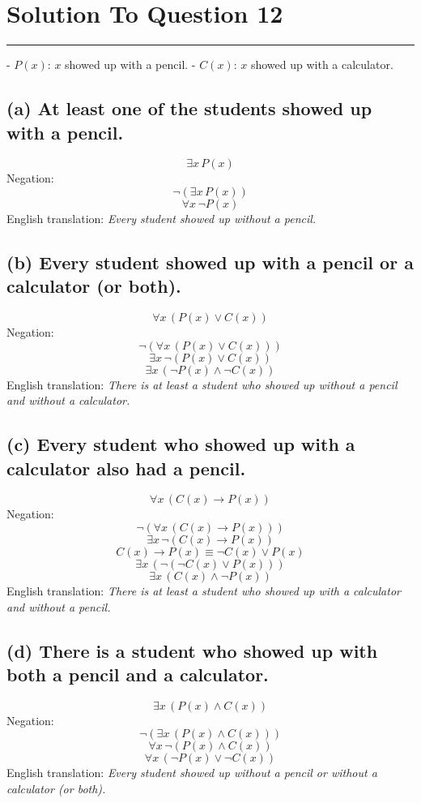 \documentclass{article}
\begin{document}
\section*{Solution To Question 12}
\hrule

- \( P(x) \): \( x \) showed up with a pencil.
- \( C(x) \): \( x \) showed up with a calculator.

\subsection*{(a) At least one of the students showed up with a pencil.}

\[
\exists x \, P(x)
\]
Negation:
\[
\lnot (\exists x \, P(x))
\]
\[
\forall x \, \lnot P(x)
\]
English translation:
\textit{Every student showed up without a pencil.}

\subsection*{(b) Every student showed up with a pencil or a calculator (or both).}
\[
\forall x \, (P(x) \lor C(x))
\]
Negation:
\[
\lnot (\forall x \, (P(x) \lor C(x)))
\]
\[
\exists x \, \lnot (P(x) \lor C(x))
\]
\[
\exists x \, (\lnot P(x) \land \lnot C(x))
\]
English translation:
\textit{There is at least a student who showed up without a pencil and without a calculator.}

\subsection*{(c) Every student who showed up with a calculator also had a pencil.}
\[
\forall x \, (C(x) \rightarrow P(x))
\]
Negation:
\[
\lnot (\forall x \, (C(x) \rightarrow P(x)))
\]
\[
\exists x \, \lnot (C(x) \rightarrow P(x))
\]
\[
C(x) \rightarrow P(x) \equiv \lnot C(x) \lor P(x)
\]
\[
\exists x \, (\lnot (\lnot C(x) \lor P(x)))
\]
\[
\exists x \, (C(x) \land \lnot P(x))
\]
English translation:
\textit{There is at least a student who showed up with a calculator and without a pencil.}

\subsection*{(d) There is a student who showed up with both a pencil and a calculator.}
\[
\exists x \, (P(x) \land C(x))
\]
Negation:
\[
\lnot (\exists x \, (P(x) \land C(x)))
\]
\[
\forall x \, \lnot (P(x) \land C(x))
\]
\[
\forall x \, (\lnot P(x) \lor \lnot C(x))
\]
English translation:
\textit{Every student showed up without a pencil or without a calculator (or both).}
\end{document}
